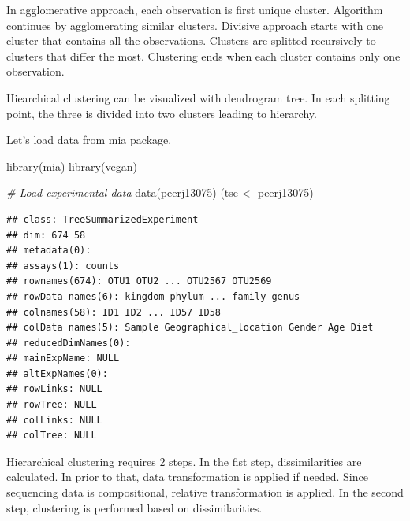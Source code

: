\documentclass[
]{book}
\newenvironment{Shaded}{\begin{snugshade}}{\end{snugshade}}
\newcommand{\CommentTok}[1]{\textcolor[rgb]{0.56,0.35,0.01}{\textit{#1}}}
\newcommand{\FunctionTok}[1]{\textcolor[rgb]{0.00,0.00,0.00}{#1}}
\newcommand{\NormalTok}[1]{#1}
\newcommand{\OtherTok}[1]{\textcolor[rgb]{0.56,0.35,0.01}{#1}}
\begin{document}
In agglomerative approach, each observation is first unique cluster.
Algorithm continues by agglomerating similar clusters. Divisive approach starts
with one cluster that contains all the observations. Clusters are splitted recursively
to clusters that differ the most. Clustering ends when each cluster contains only one
observation.

Hiearchical clustering can be visualized with dendrogram tree. In each splitting
point, the three is divided into two clusters leading to hierarchy.

Let's load data from mia package.

\begin{Shaded}
\begin{Highlighting}[]
\FunctionTok{library}\NormalTok{(mia)}
\FunctionTok{library}\NormalTok{(vegan)}

\CommentTok{\# Load experimental data}
\FunctionTok{data}\NormalTok{(peerj13075)}
\NormalTok{(tse }\OtherTok{\textless{}{-}}\NormalTok{ peerj13075)}
\end{Highlighting}
\end{Shaded}

\begin{verbatim}
## class: TreeSummarizedExperiment 
## dim: 674 58 
## metadata(0):
## assays(1): counts
## rownames(674): OTU1 OTU2 ... OTU2567 OTU2569
## rowData names(6): kingdom phylum ... family genus
## colnames(58): ID1 ID2 ... ID57 ID58
## colData names(5): Sample Geographical_location Gender Age Diet
## reducedDimNames(0):
## mainExpName: NULL
## altExpNames(0):
## rowLinks: NULL
## rowTree: NULL
## colLinks: NULL
## colTree: NULL
\end{verbatim}

Hierarchical clustering requires 2 steps. In the fist step, dissimilarities are
calculated. In prior to that, data transformation is applied if needed. Since
sequencing data is compositional, relative transformation is applied.
In the second step, clustering is performed based on dissimilarities.
\end{document}
